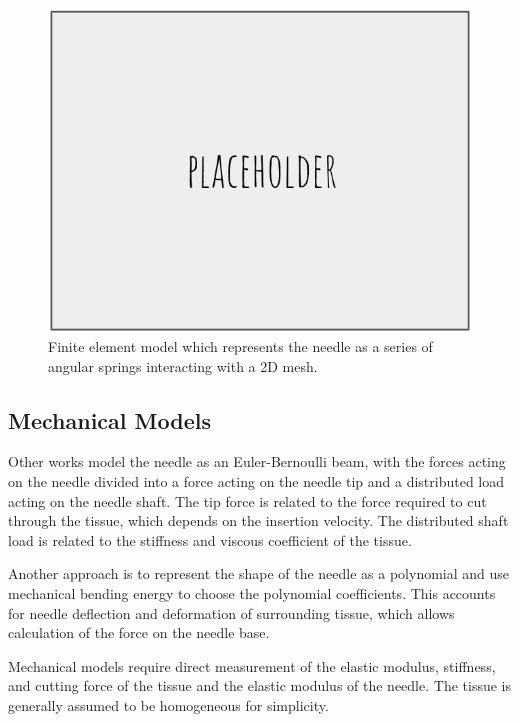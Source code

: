 \begin{figure}[h]
\includegraphics[width=1.0\textwidth]{Fig/placeholder.png}
\caption{Finite element model which represents the needle as a series of angular springs interacting with a 2D mesh\cite{goksel_modeling_2009}.}
\label{fig:needle_fe_model}
\end{figure}

\subsection{Mechanical Models}
Other works model the needle as an Euler-Bernoulli beam, with the forces acting on the needle divided into a force acting on the needle tip and a distributed load acting on the needle shaft. The tip force is related to the force required to cut through the tissue, which depends on the insertion velocity\cite{barnett_fracture_2015}. The distributed shaft load is related to the stiffness and viscous coefficient of the tissue\cite{abayazid_integrating_2013}.

Another approach is to represent the shape of the needle as a polynomial and use mechanical bending energy to choose the polynomial coefficients\cite{roesthuis_modeling_2015,misra_mechanics_2010,abayazid_integrating_2013}. This accounts for needle deflection and deformation of surrounding tissue, which allows calculation of the force on the needle base.

Mechanical models require direct measurement of the elastic modulus, stiffness, and cutting force of the tissue and the elastic modulus of the needle. The tissue is generally assumed to be homogeneous for simplicity.

